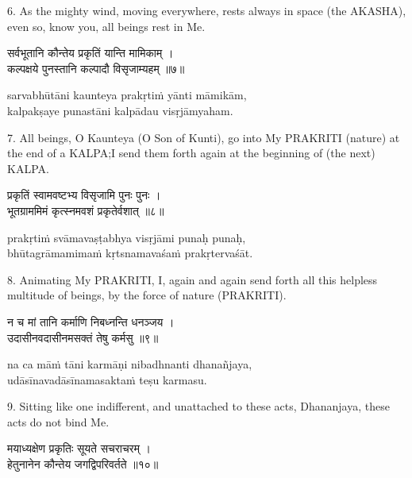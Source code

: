 6. As the mighty wind, moving everywhere, rests always in space (the AKASHA),
even so, know you, all beings rest in Me.

\begin{gitaverse}
सर्वभूतानि कौन्तेय प्रकृतिं यान्ति मामिकाम् । \\
कल्पक्षये पुनस्तानि कल्पादौ विसृजाम्यहम् ॥७॥
\end{gitaverse}

\begin{transliteration}
sarvabhūtāni kaunteya prakṛtiṁ yānti māmikām, \\
kalpakṣaye punastāni kalpādau visṛjāmyaham.
\end{transliteration}

7. All beings, O Kaunteya (O Son of Kunti), go into My PRAKRITI (nature) at the
end of a KALPA;\@ I send them forth again at the beginning of (the next)
KALPA.\@

\begin{gitaverse}
प्रकृतिं स्वामवष्टभ्य विसृजामि पुनः पुनः । \\
भूतग्राममिमं कृत्स्नमवशं प्रकृतेर्वशात् ॥८॥
\end{gitaverse}

\begin{transliteration}
prakṛtiṁ svāmavaṣṭabhya visṛjāmi punaḥ punaḥ, \\
bhūtagrāmamimaṁ kṛtsnamavaśaṁ prakṛtervaśāt.
\end{transliteration}

8. Animating My PRAKRITI, I, again and again send forth all this helpless
multitude of beings, by the force of nature (PRAKRITI).

\begin{gitaverse}
न च मां तानि कर्माणि निबध्नन्ति धनञ्जय । \\
उदासीनवदासीनमसक्तं तेषु कर्मसु ॥९॥
\end{gitaverse}

\begin{transliteration}
na ca māṁ tāni karmāṇi nibadhnanti dhanañjaya, \\
udāsīnavadāsīnamasaktaṁ teṣu karmasu.
\end{transliteration}

9. Sitting like one indifferent, and unattached to these acts, Dhananjaya,
these acts do not bind Me.

\begin{gitaverse}
मयाध्यक्षेण प्रकृतिः सूयते सचराचरम् । \\
हेतुनानेन कौन्तेय जगद्विपरिवर्तते ॥१०॥
\end{gitaverse}


